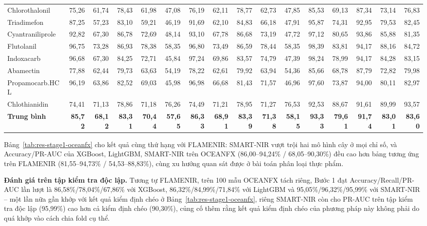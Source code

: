 \documentclass[10pt,twocolumn,twoside]{article}
\begin{document}
\begin{table}[htbp]
{\begin{tabular}{|l|rrrrr|rrrrr|rrrrr|}
Chlorothalonil & 75,26 & 61,74 & 78,43 & 61,98 & 47,08 & 76,19 & 62,11 & 78,77 & 62,73 & 47,85 & 85,53 & 69,13 & 87,34 & 73,14 & 76,83 \\
Triadimefon & 87,25 & 57,23 & 83,10 & 59,21 & 46,19 & 91,69 & 62,10 & 84,83 & 66,18 & 47,91 & 95,87 & 74,31 & 92,95 & 79,53 & 82,45 \\
Cyantraniliprole & 92,82 & 67,30 & 86,78 & 72,69 & 48,14 & 93,10 & 67,78 & 86,68 & 73,19 & 47,72 & 97,12 & 80,65 & 93,86 & 85,88 & 81,35 \\
Flutolanil & 96,75 & 73,28 & 86,93 & 78,38 & 58,35 & 96,80 & 73,49 & 86,59 & 78,44 & 58,35 & 98,39 & 83,81 & 94,17 & 88,16 & 84,72 \\
Indoxacarb & 96,68 & 67,30 & 84,25 & 72,71 & 45,84 & 97,24 & 69,86 & 83,57 & 74,79 & 47,39 & 98,24 & 78,99 & 94,17 & 84,28 & 83,15 \\
Abamectin & 77,88 & 62,44 & 79,73 & 63,63 & 54,19 & 78,22 & 62,61 & 79,92 & 63,94 & 54,36 & 85,66 & 68,78 & 87,79 & 72,82 & 79,98 \\
Propamocarb.HCL & 96,19 & 63,86 & 82,52 & 69,03 & 45,98 & 96,98 & 66,68 & 81,43 & 71,57 & 46,96 & 97,60 & 73,87 & 94,00 & 80,11 & 82,97 \\
Chlothianidin & 74,41 & 71,13 & 78,86 & 71,18 & 76,26 & 74,49 & 71,21 & 78,95 & 71,27 & 76,53 & 92,53 & 88,67 & 91,61 & 89,99 & 93,57 \\
\hline
\textbf{Trung bình} & \textbf{85,72} & \textbf{68,12} & \textbf{83,31} & \textbf{70,44} & \textbf{57,65} & \textbf{86,33} & \textbf{68,91} & \textbf{83,39} & \textbf{71,38} & \textbf{58,15} & \textbf{93,33} & \textbf{79,61} & \textbf{91,74} & \textbf{83,01} & \textbf{83,60} \\
\hline
\end{tabular}%
}
\end{table}

Bảng~\ref{tab:res-stage1-oceanfx} cho kết quả cùng thứ hạng với FLAMENIR:
SMART-NIR vượt trội hai mô hình cây ở mọi chỉ số, và Accuracy/PR-AUC của
XGBoost, LightGBM, SMART-NIR trên OCEANFX (86,00--94,24\% / 68,05--90,30\%)
đều cao hơn bảng tương ứng trên FLAMENIR (81,55--94,73\% / 54,53--88,83\%),
cùng xu hướng quan sát được ở bài toán phân loại thực phẩm.

\textbf{Đánh giá trên tập kiểm tra độc lập.} Tương tự FLAMENIR, trên 100
mẫu OCEANFX tách riêng, Bước 1 đạt Accuracy/Recall/PR-AUC lần lượt là
86,58\%/78,04\%/67,86\% với XGBoost, 86,32\%/84,99\%/71,84\% với LightGBM
và 95,05\%/96,32\%/95,99\% với SMART-NIR -- một lần nữa gần khớp với kết
quả kiểm định chéo ở Bảng~\ref{tab:res-stage1-oceanfx}, riêng SMART-NIR còn
cho PR-AUC trên tập kiểm tra độc lập (95,99\%) cao hơn cả kiểm định chéo
(90,30\%), củng cố thêm rằng kết quả kiểm định chéo của phương pháp này
không phải do quá khớp vào cách chia fold cụ thể.
\end{document}
